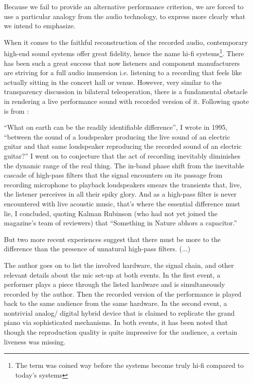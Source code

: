 Because we fail to provide an alternative performance criterion, we are forced to use a particular analogy from the audio
technology, to express more clearly what we intend to emphasize. 

When it comes to the faithful reconstruction of the recorded audio, contemporary high-end sound systems offer great fidelity, hence 
the name hi-fi systems\footnote{The term was coined way before the systems become truly hi-fi compared to today's systems}. There has 
been such a great success that now listeners and component manufacturers are striving for a full audio immersion i.e. listening to 
a recording that feels like actually sitting in the concert hall or venue. However, very similar to the transparency discussion 
in bilateral teleoperation, there is a fundamental obstacle in rendering a live performance sound with recorded version of it. 
Following quote is from \cite{atkinson}:

\begin{displayquote}
\enquote{What on earth can be the readily identifiable difference}, I wrote in 1995, \enquote{between the sound of a loudspeaker 
producing the live sound of an electric guitar and that same loudspeaker reproducing the recorded sound of an electric guitar?} 
I went on to conjecture that the act of recording inevitably diminishes the dynamic range of the real thing. The in-band phase 
shift from the inevitable cascade of high-pass filters that the signal encounters on its passage from recording microphone to 
playback loudspeakers smears the transients that, live, the listener perceives in all their spiky glory. And as a high-pass filter 
is never encountered with live acoustic music, that's where the essential difference must lie, I concluded, quoting Kalman Rubinson 
(who had not yet joined the magazine's team of reviewers) that \enquote{Something in Nature abhors a capacitor.}

But two more recent experiences suggest that there must be more to the difference than the presence of unnatural high-pass filters. 
(...)
\end{displayquote}

The author goes on to list the involved hardware, the signal chain, and other relevant details about the mic set-up at both events.
In the first event, a performer plays a piece through the listed hardware and is simultaneously recorded by the author. Then the recorded 
version of the performance is played back to the same audience from the same hardware. In the second event, a nontrivial analog/
digital hybrid device that is claimed to replicate the grand piano via sophisticated mechanisms. In both events, it has been noted 
that though the reproduction quality is quite impressive for the audience, a certain liveness was missing.

